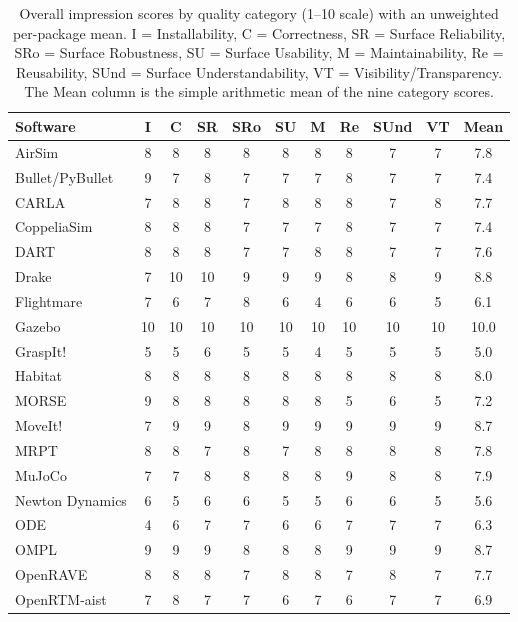 \begin{table}[p]
\centering
\caption{Overall impression scores by quality category (1--10 scale) with an unweighted per-package mean. I = Installability, C = Correctness, SR = Surface Reliability, SRo = Surface Robustness, SU = Surface Usability, M = Maintainability, Re = Reusability, SUnd = Surface Understandability, VT = Visibility/Transparency. The Mean column is the simple arithmetic mean of the nine category scores.}
\label{tab:overall-impressions}
\small
\singlespacing
\begin{tabular}{@{}p{2.5cm}cccccccccc@{}}
\toprule
\textbf{Software} & \textbf{I} & \textbf{C} & \textbf{SR} & \textbf{SRo} & \textbf{SU} & \textbf{M} & \textbf{Re} & \textbf{SUnd} & \textbf{VT} & \textbf{Mean} \\
\midrule
AirSim & 8 & 8 & 8 & 8 & 8 & 8 & 8 & 7 & 7 & 7.8 \\
Bullet/\allowbreak{}PyBullet & 9 & 7 & 8 & 7 & 7 & 7 & 8 & 7 & 7 & 7.4 \\
CARLA & 7 & 8 & 8 & 7 & 8 & 8 & 8 & 7 & 8 & 7.7 \\
CoppeliaSim & 8 & 8 & 8 & 7 & 7 & 7 & 8 & 7 & 7 & 7.4 \\
DART & 8 & 8 & 8 & 7 & 7 & 8 & 8 & 7 & 7 & 7.6 \\
Drake & 7 & 10 & 10 & 9 & 9 & 9 & 8 & 8 & 9 & 8.8 \\
Flightmare & 7 & 6 & 7 & 8 & 6 & 4 & 6 & 6 & 5 & 6.1 \\
Gazebo & 10 & 10 & 10 & 10 & 10 & 10 & 10 & 10 & 10 & 10.0 \\
GraspIt! & 5 & 5 & 6 & 5 & 5 & 4 & 5 & 5 & 5 & 5.0 \\
Habitat & 8 & 8 & 8 & 8 & 8 & 8 & 8 & 8 & 8 & 8.0 \\
MORSE & 9 & 8 & 8 & 8 & 8 & 8 & 5 & 6 & 5 & 7.2 \\
MoveIt! & 7 & 9 & 9 & 8 & 9 & 9 & 9 & 9 & 9 & 8.7 \\
MRPT & 8 & 8 & 7 & 8 & 7 & 8 & 8 & 8 & 8 & 7.8 \\
MuJoCo & 7 & 7 & 8 & 8 & 8 & 8 & 9 & 8 & 8 & 7.9 \\
Newton Dynamics & 6 & 5 & 6 & 6 & 5 & 5 & 6 & 6 & 5 & 5.6 \\
ODE & 4 & 6 & 7 & 7 & 6 & 6 & 7 & 7 & 7 & 6.3 \\
OMPL & 9 & 9 & 9 & 8 & 8 & 8 & 9 & 9 & 9 & 8.7 \\
OpenRAVE & 8 & 8 & 8 & 7 & 8 & 8 & 7 & 8 & 7 & 7.7 \\
OpenRTM-aist & 7 & 8 & 7 & 7 & 6 & 7 & 6 & 7 & 7 & 6.9 \\

\end{tabular}
\end{table}
